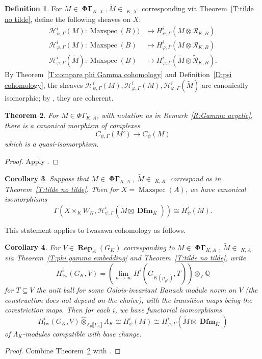 \documentclass[12pt]{amsart}
\newtheorem{theorem}{Theorem}[section]
\newtheorem{cor}[theorem]{Corollary}
\theoremstyle{definition}
\newtheorem{defn}[theorem]{Definition}
\numberwithin{equation}{theorem}
\newcommand{\QQ}{\mathbb{Q}}
\newcommand{\ZZ}{\mathbb{Z}}
\newcommand{\calH}{\mathcal{H}}
\newcommand{\calR}{\mathcal{R}}
\DeclareMathOperator{\Dfm}{\mathbf{Dfm}}
\DeclareMathOperator{\Iw}{Iw}
\DeclareMathOperator{\Maxspec}{Maxspec}
\DeclareMathOperator{\PhiGamma}{\mathbf{\Phi \Gamma}}
\DeclareMathOperator{\PhiGammatilde}{\widetilde{\mathbf{\Phi \Gamma}}}
\DeclareMathOperator{\Rep}{\mathbf{Rep}}
\begin{document}
\begin{defn}
For $M \in \PhiGamma_{K,X}, \tilde{M} \in \PhiGammatilde_{K,X}$ corresponding via
Theorem~\ref{T:tilde no tilde},
define the following sheaves on $X$:
\begin{align*}
\calH^i_{\psi, \Gamma}(M): \Maxspec(B)) &\mapsto H^i_{\psi, \Gamma}(M \otimes \calR_{K,B}) \\
\calH^i_{\varphi, \Gamma}(M): \Maxspec(B) &\mapsto H^i_{\varphi, \Gamma}(M \otimes \calR_{K,B}) \\
\calH^i_{\varphi, \Gamma}(\tilde{M}): \Maxspec(B) &\mapsto H^i_{\varphi, \Gamma}(\tilde{M} \otimes \tilde{\calR}_{K,B}).
\end{align*}
By Theorem~\ref{T:compare phi Gamma cohomology} and
Definition~\ref{D:psi cohomology}, the sheaves $\calH^i_{\psi, \Gamma}(M),
\calH^i_{\varphi,\Gamma}(M), \calH^i_{\varphi,\Gamma}(\tilde{M})$
are canonically isomorphic; by 
\cite[Theorem~4.4.3, Remark~4.4.4]{kpx}, they are coherent.
\end{defn}

\begin{theorem} \label{T:psi to deformation}
For $M \in \Phi\Gamma_{K,A}$, with notation as in Remark~\ref{R:Gamma acyclic},
there is a canonical morphism of complexes
\[
C_{\psi, \Gamma}(M') \to C_{\psi}(M)
\]
which is a quasi-isomorphism.
\end{theorem}
\begin{proof}
Apply \cite[Theorem~4.4.8]{kpx}.
\end{proof}
\begin{cor} \label{C:psi to deformation}
Suppose that $M \in \PhiGamma_{K,A}$, $\tilde{M} \in \PhiGammatilde_{K,A}$ correspond as in 
Theorem~\ref{T:tilde no tilde}. Then for $X = \Maxspec(A)$,
we have canonical isomorphisms
\[
\Gamma(X \times_K W_K, \calH^i_{\psi, \Gamma}(\tilde{M} \boxtimes \Dfm_K)) \cong H^i_\psi(M).
\]
\end{cor}

This statement applies to Iwasawa cohomology as follows.
\begin{cor} \label{C:Iwasawa}
For $V \in \Rep_A(G_K)$ corresponding to $M \in \PhiGamma_{K,A}$,
$\tilde{M} \in \PhiGammatilde_{K,A}$ via 
Theorem~\ref{T:phi gamma embedding}
and Theorem~\ref{T:tilde no tilde},
write
\[
H^i_{\Iw}(G_K, V) = \left( \lim_{n \to \infty} H^i(G_{K(\mu_{p^n})}, T) \right) \otimes_{\ZZ} \QQ
\]
for $T \subseteq V$ the unit ball for some Galois-invariant Banach module norm on $V$
(the construction does not depend on the choice), with the transition maps being the corestriction maps. Then for each $i$, we have functorial isomorphisms
\[
H^i_{\Iw}(G_K, V) \widehat{\otimes}_{\ZZ_p\llbracket \Gamma_K \rrbracket} \Lambda_K \cong H^i_\psi(M) \cong H^i_{\varphi, \Gamma}(\tilde{M} \boxtimes \Dfm_K)
\]
of $\Lambda_K$-modules compatible with base change.
\end{cor}
\begin{proof}
Combine Theorem~\ref{T:psi to deformation} with \cite[Corollary~4.4.11]{kpx}.
\end{proof}
\end{document}
